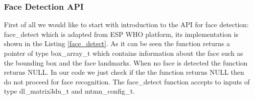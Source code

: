 
\subsubsection{Face Detection API} 

First of all we would like to start with introduction to the API for face detection: {\selectfont face\_detect} which is adapted from ESP WHO platform, its implementation is shown in the Listing \ref{face_detect}. As it can be seen the function returns a pointer of type {\selectfont box\_array\_t} which contains information about the face such as the bounding box and the face landmarks. When no face is detected the function returns {\selectfont NULL}. In our code we just check if the the function returns {\selectfont NULL} then do not proceed for face recognition. The {\selectfont face\_detect} function accepts to inputs of type {\selectfont dl\_matrix3du\_t} and {\selectfont mtmn\_config\_t}. 


